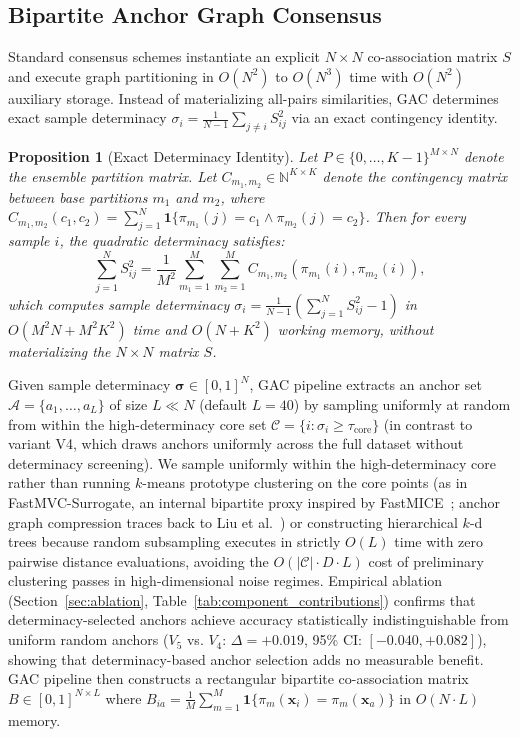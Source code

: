 \documentclass[pdflatex,sn-mathphys-num]{sn-jnl}
\theoremstyle{thmstyleone}
\newtheorem{proposition}[theorem]{Proposition}
\theoremstyle{thmstyletwo}
\theoremstyle{thmstylethree}
\begin{document}
\subsection{Bipartite Anchor Graph Consensus}\label{sec:anchor_consensus}
Standard consensus schemes instantiate an explicit $N \times N$ co-association matrix $S$ and execute graph partitioning in $O(N^2)$ to $O(N^3)$ time with $O(N^2)$ auxiliary storage. Instead of materializing all-pairs similarities, GAC determines exact sample determinacy $\sigma_i = \frac{1}{N - 1} \sum_{j \neq i} S_{ij}^2$ via an exact contingency identity.

\begin{proposition}[Exact Determinacy Identity]\label{prop:linear_determinacy}
Let $P \in \{0, \dots, K-1\}^{M \times N}$ denote the ensemble partition matrix. Let $C_{m_1, m_2} \in \mathbb{N}^{K \times K}$ denote the contingency matrix between base partitions $m_1$ and $m_2$, where $C_{m_1, m_2}(c_1, c_2) = \sum_{j=1}^N \mathbf{1}\{\pi_{m_1}(j)=c_1 \wedge \pi_{m_2}(j)=c_2\}$. Then for every sample $i$, the quadratic determinacy satisfies:
\begin{equation}
 \sum_{j=1}^N S_{ij}^2 = \frac{1}{M^2} \sum_{m_1=1}^M \sum_{m_2=1}^M C_{m_1, m_2}(\pi_{m_1}(i), \pi_{m_2}(i)),
\end{equation}
which computes sample determinacy $\sigma_i = \frac{1}{N-1}\left(\sum_{j=1}^N S_{ij}^2 - 1\right)$ in $O(M^2 N + M^2 K^2)$ time and $O(N + K^2)$ working memory, without materializing the $N \times N$ matrix $S$.
\end{proposition}

Given sample determinacy $\boldsymbol{\sigma} \in [0, 1]^N$, GAC pipeline extracts an anchor set $\mathcal{A} = \{a_1, \dots, a_L\}$ of size $L \ll N$ (default $L=40$) by sampling uniformly at random from within the high-determinacy core set $\mathcal{C} = \{i : \sigma_i \ge \tau_{\text{core}}\}$ (in contrast to variant V4, which draws anchors uniformly across the full dataset without determinacy screening). We sample uniformly within the high-determinacy core rather than running $k$-means prototype clustering on the core points (as in FastMVC-Surrogate, an internal bipartite proxy inspired by FastMICE~\cite{huang2023fastmice}; anchor graph compression traces back to Liu et al.~\cite{liu2010large}) or constructing hierarchical $k$-d trees because random subsampling executes in strictly $O(L)$ time with zero pairwise distance evaluations, avoiding the $O(|\mathcal{C}| \cdot D \cdot L)$ cost of preliminary clustering passes in high-dimensional noise regimes. Empirical ablation (Section~\ref{sec:ablation}, Table~\ref{tab:component_contributions}) confirms that determinacy-selected anchors achieve accuracy statistically indistinguishable from uniform random anchors ($V_5$ vs. $V_4$: $\Delta = +0.019$, 95\% CI: $[-0.040, +0.082]$), showing that determinacy-based anchor selection adds no measurable benefit. GAC pipeline then constructs a rectangular bipartite co-association matrix $B \in [0, 1]^{N \times L}$ where $B_{ia} = \frac{1}{M}\sum_{m=1}^M \mathbf{1}\{\pi_m(\mathbf{x}_i) = \pi_m(\mathbf{x}_a)\}$ in $O(N \cdot L)$ memory.
\end{document}
